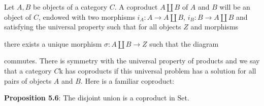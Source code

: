 \documentclass{report}
\begin{document}
Let $A, B$ be objects of a category $C$. A coproduct $A \coprod B$ of $A$ and $B$ will be an object of $C$, endowed with two morphisms $i_{A} : A \rightarrow A \coprod B$, $i_{B} : B \rightarrow A \coprod B$ and satisfying the universal property such that for all objects $Z$ and morphisms
    \begin{center}
    \end{center}
there exists a unique morphism $\sigma : A \coprod B \rightarrow Z$ such that the diagram
    \begin{center}
    \end{center}
commutes. There is symmetry with the universal property of products and we say that a category $C$k has coproducts if this universal problem has a solution for all pairs of objects $A$ and $B$. Here is a familiar coproduct:

\textbf{Proposition 5.6}: The disjoint union is a coproduct in $\text{Set}$.
\end{document}

